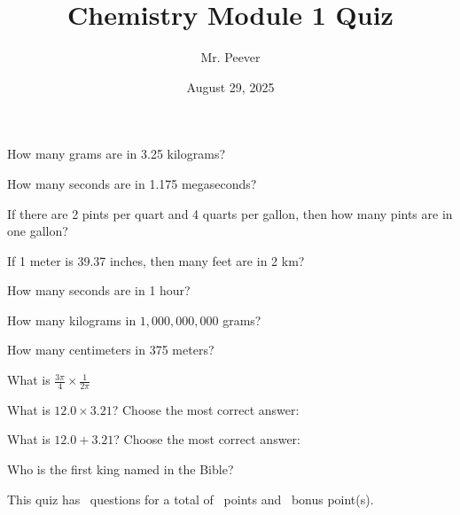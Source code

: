 \documentclass[11pt,addpoints]{exam}   	%
\title{Chemistry Module 1 Quiz}
\author{Mr. Peever}
\date{August 29, 2025}							%
\begin{document}
\maketitle

\pointsinrightmargin

\begin{center}
\end{center}
\vspace{0.1in}
\vspace{0.2in}

\begin{questions}

\question[1]
How many grams are in 3.25 kilograms?

\question[1]
How many seconds are in 1.175 megaseconds?

\question[1]
If there are 2 pints per quart and 4 quarts per gallon, then how many pints are in one gallon?

\question[1]
If 1 meter is 39.37 inches, then many feet are in 2 km?

\question[1]
How many seconds are in 1 hour?

\question[1]
How many kilograms in $1,000,000,000$ grams?

\question[1]
How many centimeters in 375 meters?

\question[1]
What is  $\frac{3 \pi}{4} \times \frac{1}{2 \pi}$

\question[1]
What is $ 12.0 \times 3.21 $? Choose the most correct answer:

\begin{choices}
\end{choices}
\vspace{.2in}

\question[1]
What is $ 12.0 + 3.21 $? Choose the most correct answer:

\begin{choices}
\end{choices}

\vspace{1in}
\bonusquestion[1]
Who is the first king named in the Bible?

\end{questions}

\vspace{2in}

\begin{center}
This quiz has \numquestions\ questions for a total of \numpoints\ points and \numbonuspoints\ bonus point(s).
\end{center}
\end{document}
